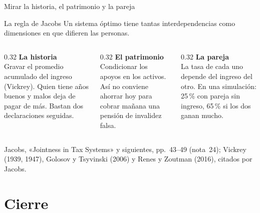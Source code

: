 \documentclass[aspectratio=169,11pt]{beamer}
\newcommand{\fuente}[1]{\par\vfill{\small\color{cGris}#1\par}}
\begin{document}
\begin{frame}{Mirar la historia, el patrimonio y la pareja}
  \begin{block}{La regla de Jacobs}
    Un sistema óptimo tiene tantas interdependencias como dimensiones en que difieren las personas.
  \end{block}
  \pause
  \begin{columns}[T]
    \begin{column}{0.32\textwidth}
      \textbf{La historia}\\[2pt]
      Gravar el promedio acumulado del ingreso (Vickrey). Quien tiene años buenos y malos deja de pagar de más. Bastan dos declaraciones seguidas.
    \end{column}
    \begin{column}{0.32\textwidth}
      \pause
      \textbf{El patrimonio}\\[2pt]
      Condicionar los apoyos en los activos. Así no conviene ahorrar hoy para cobrar mañana una pensión de invalidez falsa.
    \end{column}
    \begin{column}{0.32\textwidth}
      \pause
      \textbf{La pareja}\\[2pt]
      La tasa de cada uno depende del ingreso del otro. En una simulación: 25\,\% con pareja sin ingreso, 65\,\% si los dos ganan mucho.
    \end{column}
  \end{columns}
  \fuente{Jacobs, «Jointness in Tax Systems» y siguientes, pp.~43--49 (nota~24); Vickrey (1939, 1947), Golosov y Tsyvinski (2006) y Renes y Zoutman (2016), citados por Jacobs.}
\end{frame}

\section{Cierre}
\end{document}

